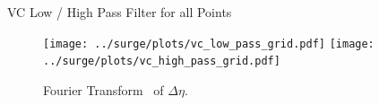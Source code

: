 \begin{frame}{VC Low / High Pass Filter for all Points}
\vspace{-30pt}
\hspace{-30pt}
 \begin{minipage}{1.15\textwidth}
\begin{figure}[htb!]
    \centering
   \hspace{-40pt} \texttt{[image: ../surge/plots/vc\_low\_pass\_grid.pdf]}
        \texttt{[image: ../surge/plots/vc\_high\_pass\_grid.pdf]}
    \vspace{-7pt}
    \caption{Fourier Transform~\cite{cooley1965algorithm} of $\Delta\eta$.}
\end{figure}
\end{minipage}
\end{frame}
